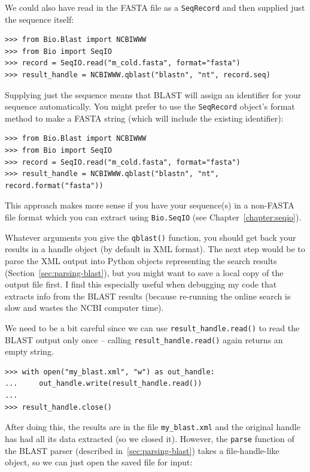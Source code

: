 We could also have read in the FASTA file as a \verb|SeqRecord| and then
supplied just the sequence itself:

\begin{verbatim}
>>> from Bio.Blast import NCBIWWW
>>> from Bio import SeqIO
>>> record = SeqIO.read("m_cold.fasta", format="fasta")
>>> result_handle = NCBIWWW.qblast("blastn", "nt", record.seq)
\end{verbatim}

Supplying just the sequence means that BLAST will assign an identifier
for your sequence automatically.  You might prefer to use the
\verb|SeqRecord| object's format method to make a FASTA string
(which will include the existing identifier):

\begin{verbatim}
>>> from Bio.Blast import NCBIWWW
>>> from Bio import SeqIO
>>> record = SeqIO.read("m_cold.fasta", format="fasta")
>>> result_handle = NCBIWWW.qblast("blastn", "nt", record.format("fasta"))
\end{verbatim}

This approach makes more sense if you have your sequence(s) in a
non-FASTA file format which you can extract using \verb|Bio.SeqIO|
(see Chapter~\ref{chapter:seqio}).

Whatever arguments you give the \verb|qblast()| function, you should
get back your results in a handle object (by default in XML format).
The next step would be to parse the XML output into Python objects
representing the search results (Section~\ref{sec:parsing-blast}),
but you might want to save a local copy of the output file first.
I find this especially useful when debugging my code that extracts
info from the BLAST results (because re-running the online search
is slow and wastes the NCBI computer time).

We need to be a bit careful since we can use \verb|result_handle.read()| to
read the BLAST output only once -- calling \verb|result_handle.read()| again
returns an empty string.

\begin{verbatim}
>>> with open("my_blast.xml", "w") as out_handle:
...     out_handle.write(result_handle.read())
...
>>> result_handle.close()
\end{verbatim}

After doing this, the results are in the file \verb|my_blast.xml| and the
original handle has had all its data extracted (so we closed it). However,
the \verb|parse| function of the BLAST parser (described
in~\ref{sec:parsing-blast}) takes a file-handle-like object, so
we can just open the saved file for input:


